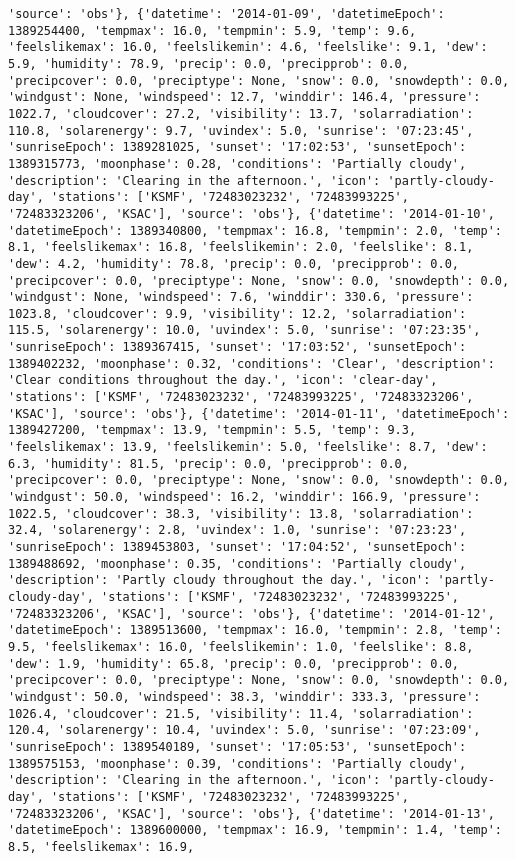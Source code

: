 \documentclass[
  letterpaper,
  DIV=11,
  numbers=noendperiod]{scrartcl}
\begin{document}
\begin{verbatim}
'source': 'obs'}, {'datetime': '2014-01-09', 'datetimeEpoch': 1389254400, 'tempmax': 16.0, 'tempmin': 5.9, 'temp': 9.6, 'feelslikemax': 16.0, 'feelslikemin': 4.6, 'feelslike': 9.1, 'dew': 5.9, 'humidity': 78.9, 'precip': 0.0, 'precipprob': 0.0, 'precipcover': 0.0, 'preciptype': None, 'snow': 0.0, 'snowdepth': 0.0, 'windgust': None, 'windspeed': 12.7, 'winddir': 146.4, 'pressure': 1022.7, 'cloudcover': 27.2, 'visibility': 13.7, 'solarradiation': 110.8, 'solarenergy': 9.7, 'uvindex': 5.0, 'sunrise': '07:23:45', 'sunriseEpoch': 1389281025, 'sunset': '17:02:53', 'sunsetEpoch': 1389315773, 'moonphase': 0.28, 'conditions': 'Partially cloudy', 'description': 'Clearing in the afternoon.', 'icon': 'partly-cloudy-day', 'stations': ['KSMF', '72483023232', '72483993225', '72483323206', 'KSAC'], 'source': 'obs'}, {'datetime': '2014-01-10', 'datetimeEpoch': 1389340800, 'tempmax': 16.8, 'tempmin': 2.0, 'temp': 8.1, 'feelslikemax': 16.8, 'feelslikemin': 2.0, 'feelslike': 8.1, 'dew': 4.2, 'humidity': 78.8, 'precip': 0.0, 'precipprob': 0.0, 'precipcover': 0.0, 'preciptype': None, 'snow': 0.0, 'snowdepth': 0.0, 'windgust': None, 'windspeed': 7.6, 'winddir': 330.6, 'pressure': 1023.8, 'cloudcover': 9.9, 'visibility': 12.2, 'solarradiation': 115.5, 'solarenergy': 10.0, 'uvindex': 5.0, 'sunrise': '07:23:35', 'sunriseEpoch': 1389367415, 'sunset': '17:03:52', 'sunsetEpoch': 1389402232, 'moonphase': 0.32, 'conditions': 'Clear', 'description': 'Clear conditions throughout the day.', 'icon': 'clear-day', 'stations': ['KSMF', '72483023232', '72483993225', '72483323206', 'KSAC'], 'source': 'obs'}, {'datetime': '2014-01-11', 'datetimeEpoch': 1389427200, 'tempmax': 13.9, 'tempmin': 5.5, 'temp': 9.3, 'feelslikemax': 13.9, 'feelslikemin': 5.0, 'feelslike': 8.7, 'dew': 6.3, 'humidity': 81.5, 'precip': 0.0, 'precipprob': 0.0, 'precipcover': 0.0, 'preciptype': None, 'snow': 0.0, 'snowdepth': 0.0, 'windgust': 50.0, 'windspeed': 16.2, 'winddir': 166.9, 'pressure': 1022.5, 'cloudcover': 38.3, 'visibility': 13.8, 'solarradiation': 32.4, 'solarenergy': 2.8, 'uvindex': 1.0, 'sunrise': '07:23:23', 'sunriseEpoch': 1389453803, 'sunset': '17:04:52', 'sunsetEpoch': 1389488692, 'moonphase': 0.35, 'conditions': 'Partially cloudy', 'description': 'Partly cloudy throughout the day.', 'icon': 'partly-cloudy-day', 'stations': ['KSMF', '72483023232', '72483993225', '72483323206', 'KSAC'], 'source': 'obs'}, {'datetime': '2014-01-12', 'datetimeEpoch': 1389513600, 'tempmax': 16.0, 'tempmin': 2.8, 'temp': 9.5, 'feelslikemax': 16.0, 'feelslikemin': 1.0, 'feelslike': 8.8, 'dew': 1.9, 'humidity': 65.8, 'precip': 0.0, 'precipprob': 0.0, 'precipcover': 0.0, 'preciptype': None, 'snow': 0.0, 'snowdepth': 0.0, 'windgust': 50.0, 'windspeed': 38.3, 'winddir': 333.3, 'pressure': 1026.4, 'cloudcover': 21.5, 'visibility': 11.4, 'solarradiation': 120.4, 'solarenergy': 10.4, 'uvindex': 5.0, 'sunrise': '07:23:09', 'sunriseEpoch': 1389540189, 'sunset': '17:05:53', 'sunsetEpoch': 1389575153, 'moonphase': 0.39, 'conditions': 'Partially cloudy', 'description': 'Clearing in the afternoon.', 'icon': 'partly-cloudy-day', 'stations': ['KSMF', '72483023232', '72483993225', '72483323206', 'KSAC'], 'source': 'obs'}, {'datetime': '2014-01-13', 'datetimeEpoch': 1389600000, 'tempmax': 16.9, 'tempmin': 1.4, 'temp': 8.5, 'feelslikemax': 16.9, 
\end{verbatim}
\end{document}
